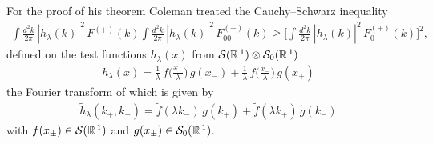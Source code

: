 \documentclass[a4paper,12pt] {article}
\begin{document}
For the proof of his theorem Coleman treated the Cauchy--Schwarz
inequality
%
\begin{eqnarray}\label{label5.1}
\int \frac{d^2k}{2\pi}\,|\tilde{h}_{\lambda}(k)|^2\,F^{(+)}(k)\int
\frac{d^2k}{2\pi}\,|\tilde{h}_{\lambda}(k)|^2\,F^{(+)}_{00}(k)\ge
\Big[\int
\frac{d^2k}{2\pi}\,|\tilde{h}_{\lambda}(k)|^2\,F^{(+)}_0(k)\Big]^2,
\end{eqnarray}
%
defined on the test functions $h_{\lambda}(x)$ from ${\cal
S}(\mathbb{R}^{\,1})\otimes {\cal S}_0(\mathbb{R}^{\,1})$:
%
\begin{eqnarray}\label{label5.2}
h_{\lambda}(x) =
\frac{1}{\lambda}\,f\Big(\frac{x_+}{\lambda}\Big)\,g(x_-) + 
\frac{1}{\lambda}\,f\Big(\frac{x_-}{\lambda}\Big)\,g(x_+)
\end{eqnarray}
%
the Fourier transform of which is given by
%
\begin{eqnarray}\label{label5.3}
\tilde{h}_{\lambda}(k_+,k_-) = \tilde{f}(\lambda k_-)\,\tilde{g}(k_+) +
\tilde{f}(\lambda k_+)\,\tilde{g}(k_-)
\end{eqnarray}
%
with $f(x_{\pm}) \in {\cal S}(\mathbb{R}^{\,1})$ and $g(x_{\pm}) \in
{\cal S}_0(\mathbb{R}^{\,1})$.
\end{document}

